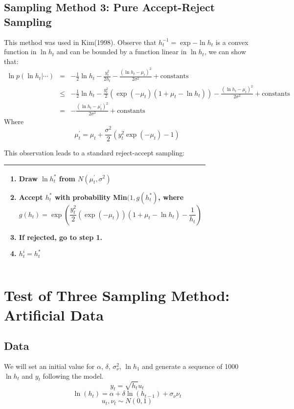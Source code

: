 \documentclass{article}
\begin{document}
\subsection{Sampling Method 3: Pure Accept-Reject Sampling}
This method was used in Kim(1998). Observe that $h_t^{-1}=\exp{-\ln h_t}$ is a convex function in $\ln h_t$ and can be bounded by a function linear in $\ln h_t$, we can show that:
\begin{eqnarray}
\ln{p(\ln h_t|\cdots)}&=&-\frac{1}{2}\ln h_t-\frac{y_t^2}{2h_t}-\frac{(\ln h_t-\mu_t)^2}{2\sigma^2}+\textrm{constants}\nonumber\\
&\leq&-\frac{1}{2}\ln h_t-\frac{y_t^2}{2}\left(\exp(-\mu_t)(1+\mu_t-\ln h_t)\right)-\frac{(\ln h_t-\mu_t)^2}{2\sigma^2}+\textrm{constants}\nonumber\\
&=&-\frac{(\ln h_t-\mu^\prime_t)^2}{2\sigma^2}+\textrm{constants}
\end{eqnarray}
Where
\[
\mu^\prime_t=\mu_t+\frac{\sigma^2}{2}(y_t^2\exp(-\mu_t)-1)
\]

This observation leads to a standard reject-accept sampling:

\begin{tabular}{|p{11cm}|}
\hline
\begin{enumerate}
\item
Draw $\ln h^*_t$ from $N(\mu^\prime_t,\sigma^2)$
\item
Accept $h^*_t$ with probability Min$(1,g(h^*_t)$, where
\[
g(h_t)=\exp(\frac{y_t^2}{2}(\exp(-\mu_t))(1+\mu_t-\ln h_t)-\frac{1}{h_t})
\]
\item
If rejected, go to step 1.
\item
$h^i_t=h^*_t$
\end{enumerate}\\
\hline
\end{tabular}

\section{Test of Three Sampling Method: Artificial Data}
\subsection{Data}
We will set an initial value for $\alpha$, $\delta$, $\sigma_\nu^2$, $\ln h_1$ and generate a sequence of 1000 $\ln h_t$ and $y_t$ following the model.
\[
y_t=\sqrt{h_t}u_t
\]
\[
\ln(h_t)=\alpha+\delta\ln(h_{t-1})+\sigma_\nu\nu_t
\]
\[
u_t,\nu_t\sim N(0,1)
\]
\end{document}
